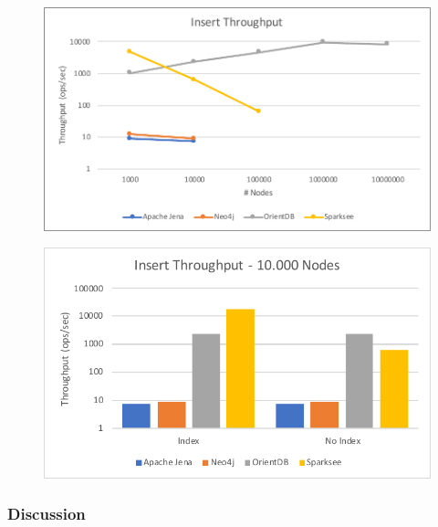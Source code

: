 \begin{figure}[h!]
  \begin{minipage}{.5\textwidth}
    \centering
    \includegraphics[width=\textwidth]{images/throughput/withoutIndexThroughput}
    \label{fig:withoutIndexThroughput}
  \end{minipage}
  \begin{minipage}{.5\textwidth}
    \centering
    \includegraphics[width=\textwidth]{images/throughput/withWithoutIndexThroughputFixNodes}
    \label{fig:withWithoutIndexThroughputFixNodes}
  \end{minipage}
\end{figure}

\subsubsection{Discussion}

